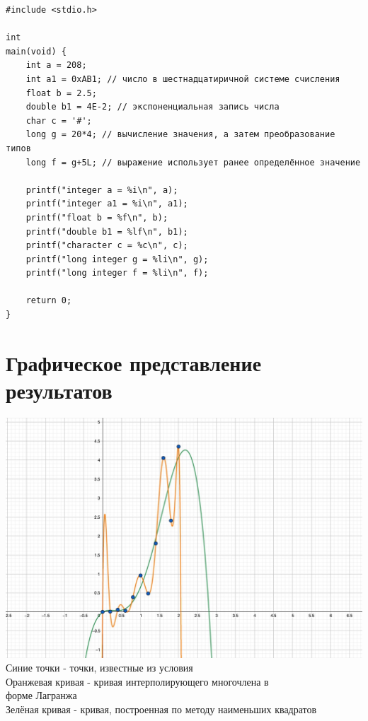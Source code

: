 \documentclass[a4paper, 14pt]{extreport}
\begin{document}
\vspace{-\medskipamount}
\vspace{-2\baselineskip}
\vspace{25pt}
\begin{verbatim}
#include <stdio.h>

int 
main(void) {
    int a = 208;
    int a1 = 0xAB1; // число в шестнадцатиричной системе счисления
    float b = 2.5;
    double b1 = 4E-2; // экспоненциальная запись числа
    char c = '#';
    long g = 20*4; // вычисление значения, а затем преобразование типов
    long f = g+5L; // выражение использует ранее определённое значение
    
    printf("integer a = %i\n", a);
    printf("integer a1 = %i\n", a1);
    printf("float b = %f\n", b);
    printf("double b1 = %lf\n", b1);
    printf("character c = %c\n", c);
    printf("long integer g = %li\n", g);
    printf("long integer f = %li\n", f);
    
    return 0;
}
\end{verbatim}

\section*{Графическое представление результатов}

\includegraphics[width =\textwidth]{graphic}
Синие точки - точки, известные из условия \\
Оранжевая кривая - кривая интерполирующего многочлена в \\ форме Лагранжа \\
Зелёная кривая - кривая, построенная по методу наименьших квадратов
\end{document}
